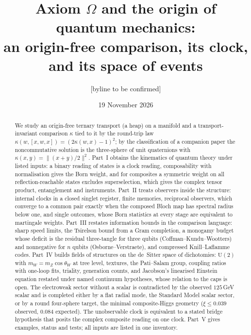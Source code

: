 \documentclass[aps,pra,onecolumn,superscriptaddress,nofootinbib,10pt]{revtex4-2}
\theoremstyle{definition}
\theoremstyle{remark}
\newcommand{\hp}[3]{[#1,#2,#3]}
\newcommand{\U}{\mathrm{U}}
\begin{document}
\title{Axiom $\Omega$ and the origin of quantum mechanics:\\ an origin-free comparison, its clock, and its space of events}
\author{[byline to be confirmed]}
\date{19 November 2026}

\begin{abstract}
We study an origin-free ternary transport (a heap) on a manifold and a transport-invariant comparison
$\kappa$ tied to it by the round-trip law $\kappa(w,\hp{x}{w}{x})=(2\kappa(w,x)-1)^2$; by the classification of a
companion paper the noncommutative solution is the three-sphere of unit quaternions with
$\kappa(x,y)=\lVert(x+y)/2\rVert^2$.  Part~I obtains the kinematics of quantum theory under listed inputs: a binary reading of
states is a clock reading, composability with normalisation gives the Born weight, and for composites a
symmetric weight on all reflection-reachable states excludes superselection, which gives the complex tensor
product, entanglement and instruments.  Part~II
treats observers inside the structure: internal clocks in a closed singlet register, finite memories,
reciprocal observers, which converge to a common pair exactly when the composed Bloch map has spectral radius
below one, and single outcomes, whose Born statistics at every stage are equivalent to martingale weights.  Part~III restates information bounds in
the comparison language: sharp speed limits, the Tsirelson bound from a Gram completion, a
monogamy budget whose deficit is the residual three-tangle for three qubits (Coffman--Kundu--Wootters) and
nonnegative for $n$ qubits (Osborne--Verstraete), and compressed Knill--Laflamme codes.
Part~IV builds fields of structures on the de~Sitter space of dichotomies: $\U(2)$ with $m_W=m_Z\cos\theta_W$ at
tree level, textures, the Pati--Salam group, coupling ratios with one-loop fits, triality, generation counts,
and Jacobson's linearised Einstein equation restated under named continuum hypotheses, whose relation to the
caps is open.  The electroweak sector without a scalar is contradicted by
the observed $125$\,GeV scalar and is completed either by a flat radial mode, the Standard Model scalar sector,
or by a round four-sphere target, the minimal composite-Higgs geometry ($\xi\le0.039$ observed, $0.084$ expected).
The unobservable clock is equivalent to a stated bridge hypothesis that posits the complex composite reading
on one clock.  Part~V gives examples, status and tests; all inputs are listed in one inventory.
\end{abstract}
\end{document}
